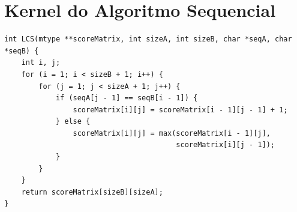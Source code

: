 \section{Kernel do Algoritmo Sequencial}
\label{sec:sequencial}

\begin{lstlisting}[caption={Kernel sequencial do algoritmo LCS em linguagem C.}, label={lst:kernel_seq}]
int LCS(mtype **scoreMatrix, int sizeA, int sizeB, char *seqA, char *seqB) {
    int i, j;
    for (i = 1; i < sizeB + 1; i++) {
        for (j = 1; j < sizeA + 1; j++) {
            if (seqA[j - 1] == seqB[i - 1]) {
                scoreMatrix[i][j] = scoreMatrix[i - 1][j - 1] + 1;
            } else {
                scoreMatrix[i][j] = max(scoreMatrix[i - 1][j], 
                                        scoreMatrix[i][j - 1]);
            }
        }
    }
    return scoreMatrix[sizeB][sizeA];
}
\end{lstlisting}
